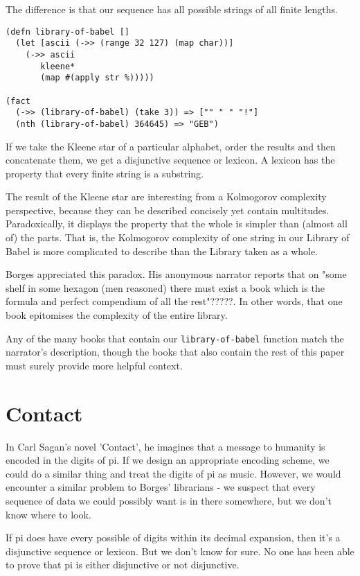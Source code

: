 \documentclass[numbers]{sigplanconf}
\begin{document}
The difference is that our sequence has all possible strings of all finite lengths.

\begin{verbatim}
(defn library-of-babel []
  (let [ascii (->> (range 32 127) (map char))]
    (->> ascii
       kleene*
       (map #(apply str %)))))

(fact
  (->> (library-of-babel) (take 3)) => ["" " " "!"]
  (nth (library-of-babel) 364645) => "GEB")
\end{verbatim}

If we take the Kleene star of a particular alphabet, order the results and then concatenate them, we get
a disjunctive sequence or lexicon. A lexicon has the property that every finite string is a substring.

The result of the Kleene star are interesting from a Kolmogorov complexity perspective, because they can be described
concisely yet contain multitudes. Paradoxically, it displays the property that the whole is simpler than (almost all of)
the parts. That is, the Kolmogorov complexity of one string in our Library of Babel is more complicated to describe
than the Library taken as a whole.

Borges appreciated this paradox. His anonymous narrator reports that on "some shelf in some hexagon (men reasoned)
there must exist a book which is the formula and perfect compendium of all the rest"?????. In other words, that one book
epitomises the complexity of the entire library.

Any of the many books that contain our \verb|library-of-babel| function match the narrator's description,
though the books that also contain the rest of this paper must surely provide more helpful context.

\section{Contact}

In Carl Sagan's novel 'Contact', he imagines that a message to humanity is encoded in the digits of pi. If we design an
appropriate encoding scheme, we could do a similar thing and treat the digits of pi as music. However, we would encounter
a similar problem to Borges' librarians - we suspect that every sequence of data we could possibly want is in there
somewhere, but we don't know where to look.

If pi does have every possible of digits within its decimal expansion, then it's a disjunctive
sequence or lexicon. But we don't know for sure. No one has been able to prove that pi is either disjunctive or not disjunctive.
\end{document}

